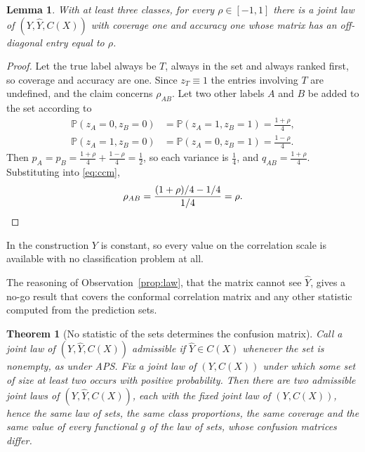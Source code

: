 \documentclass[11pt]{article}
\newtheorem{theorem}{Theorem}
\newtheorem{lemma}{Lemma}
\theoremstyle{definition}
\theoremstyle{definition}
\theoremstyle{remark}
\newcommand{\Prob}{\mathbb{P}}
\begin{document}
\begin{lemma}\label{prop:any}
With at least three classes, for every $\rho \in [-1, 1]$ there is a joint law of $(Y, \hat Y,
C(X))$ with coverage one and accuracy one whose matrix has an off-diagonal entry equal to $\rho$.
\end{lemma}

\begin{proof}
Let the true label always be $T$, always in the set and always ranked first, so coverage and
accuracy are one. Since $z_T \equiv 1$ the entries involving $T$ are undefined, and the claim
concerns $\rho_{AB}$. Let two other labels $A$ and $B$ be added to the set according to
\begin{align*}
\Prob(z_A = 0, z_B = 0) &= \Prob(z_A = 1, z_B = 1) = \frac{1+\rho}{4}, \\
\Prob(z_A = 1, z_B = 0) &= \Prob(z_A = 0, z_B = 1) = \frac{1-\rho}{4}.
\end{align*}
Then $p_A = p_B = \tfrac{1+\rho}{4} + \tfrac{1-\rho}{4} = \tfrac12$, so each variance is
$\tfrac14$, and $q_{AB} = \tfrac{1+\rho}{4}$. Substituting into \eqref{eq:ccm},
\[
\rho_{AB} = \frac{(1+\rho)/4 - 1/4}{1/4} = \rho. \qedhere
\]
\end{proof}

In the construction $Y$ is constant, so every value on the correlation scale is available with no
classification problem at all.

The reasoning of Observation~\ref{prop:law}, that the matrix cannot see $\hat Y$, gives a no-go
result that covers the conformal correlation matrix and any other statistic computed from the
prediction sets.

\begin{theorem}[No statistic of the sets determines the confusion matrix]\label{thm:nogo}
Call a joint law of $(Y, \hat Y, C(X))$ admissible if $\hat Y \in C(X)$ whenever the set is nonempty,
as under APS. Fix a joint law of $(Y, C(X))$ under which some set of size at least two occurs with
positive probability. Then there are two admissible joint laws of $(Y, \hat Y, C(X))$, each with the
fixed joint law of $(Y, C(X))$, hence the same law of sets, the same class proportions, the same
coverage and the same value of every functional $g$ of the law of sets, whose confusion matrices
differ.
\end{theorem}
\end{document}
